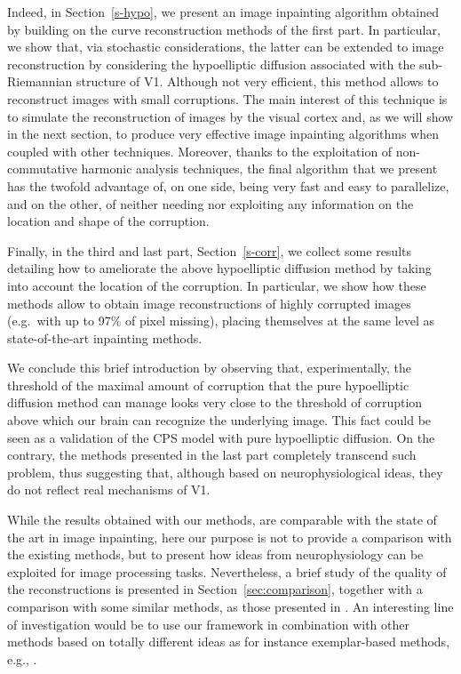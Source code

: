 \documentclass[proc]{edpsmath}
\begin{document}
Indeed, in Section~\ref{s-hypo}, we present an image inpainting algorithm obtained by building on the curve reconstruction methods of the first part. In particular, we show that, via stochastic considerations, the latter can be extended to image reconstruction by considering the hypoelliptic diffusion associated with the sub-Riemannian structure of V1. Although not very efficient, this method allows to reconstruct images with small corruptions. The main interest of this technique is to simulate the reconstruction of images by the visual cortex and, as we will show in the next section, to produce very effective image inpainting algorithms when coupled with other techniques. Moreover, thanks to the exploitation of non-commutative harmonic analysis techniques, the final algorithm that we present has the twofold advantage of, on one side, being very fast and easy to parallelize, and on the other, of neither needing nor exploiting any information on the location and shape of the corruption.

Finally, in the third and last part, Section~\ref{s-corr}, we collect some results detailing how to ameliorate the above hypoelliptic diffusion method by taking into account the location of the corruption. In particular, we show how these methods allow to obtain image reconstructions of highly corrupted images (e.g.\ with up to 97\% of pixel missing), placing themselves at the same level as state-of-the-art inpainting methods.

We conclude this brief introduction by observing that, experimentally, the threshold of the maximal amount of corruption that the pure hypoelliptic diffusion method can manage looks very close to the threshold of corruption above which our brain can recognize the underlying image. This fact could be seen as a validation of the CPS model with pure hypoelliptic diffusion. On the contrary, the methods presented in the last part completely transcend such problem, thus suggesting that, although based on neurophysiological ideas, they do not reflect real mechanisms of V1.

While the results obtained with our methods, are comparable with the state of the art in image inpainting, here our purpose is not to provide a comparison with the existing methods, but to present how ideas from neurophysiology can be exploited for image processing tasks.  Nevertheless, a brief study of the quality of the reconstructions is presented in Section~\ref{sec:comparison}, together with a comparison with some similar methods, as those presented in \cite{cao,GWWBBS}. An interesting line of investigation would be to use our framework in combination with other methods based on totally different ideas as for instance exemplar-based methods, e.g., \cite{Bredies13,Facciolo}.
\end{document}
